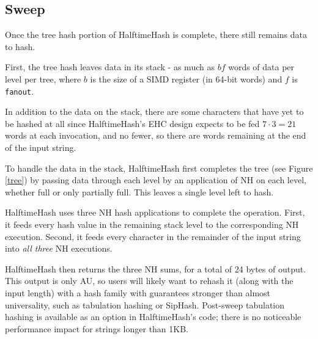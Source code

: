 \documentclass[sigconf, nonacm]{acmart}
\begin{document}




\subsection{Sweep}


Once the tree hash portion of HalftimeHash is complete, there still remains data to hash.

First, the tree hash leaves data in its stack - as much as $bf$ words of data per level per tree, where $b$ is the size of a SIMD register (in 64-bit words) and $f$ is \texttt{fanout}.

In addition to the data on the stack, there are some characters that have yet to be hashed at all since HalftimeHash's EHC design expects to be fed $7 \cdot 3 = 21$ words at each invocation, and no fewer, so there are words remaining at the end of the input string.

To handle the data in the stack, HalftimeHash first completes the tree (see Figure \ref{tree}) by passing data through each level by an application of NH on each level, whether full or only partially full.
This leaves a single level left to hash.

HalftimeHash uses three NH hash applications to complete the operation.
First, it feeds every hash value in the remaining stack level to the corresponding NH execution.
Second, it feeds every character in the remainder of the input string into {\em all three} NH executions.

HalftimeHash then returns the three NH sums, for a total of 24 bytes of output.
This output is only AU, so users will likely want to rehash it (along with the input length) with a hash family with guarantees stronger than almost universality, such as tabulation hashing or SipHash. \cite{tabulation,siphash}
Post-sweep tabulation hashing is available as an option in HalftimeHash's code; there is no noticeable performance impact for strings longer than 1KB.
\end{document}
